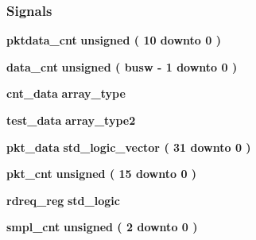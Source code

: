 \subsubsection*{Signals}
 \begin{DoxyCompactItemize}
\item 
{\bf pktdata\+\_\+cnt} {\bfseries \textcolor{comment}{unsigned}\textcolor{vhdlchar}{ }\textcolor{vhdlchar}{(}\textcolor{vhdlchar}{ }\textcolor{vhdlchar}{ } \textcolor{vhdldigit}{10} \textcolor{vhdlchar}{ }\textcolor{keywordflow}{downto}\textcolor{vhdlchar}{ }\textcolor{vhdlchar}{ } \textcolor{vhdldigit}{0} \textcolor{vhdlchar}{ }\textcolor{vhdlchar}{)}\textcolor{vhdlchar}{ }} 
\item 
{\bf data\+\_\+cnt} {\bfseries \textcolor{comment}{unsigned}\textcolor{vhdlchar}{ }\textcolor{vhdlchar}{(}\textcolor{vhdlchar}{ }\textcolor{vhdlchar}{ }\textcolor{vhdlchar}{ }\textcolor{vhdlchar}{ }{\bfseries {\bf busw}} \textcolor{vhdlchar}{-\/}\textcolor{vhdlchar}{ } \textcolor{vhdldigit}{1} \textcolor{vhdlchar}{ }\textcolor{keywordflow}{downto}\textcolor{vhdlchar}{ }\textcolor{vhdlchar}{ } \textcolor{vhdldigit}{0} \textcolor{vhdlchar}{ }\textcolor{vhdlchar}{)}\textcolor{vhdlchar}{ }} 
\item 
{\bf cnt\+\_\+data} {\bfseries {\bfseries {\bf array\+\_\+type}} \textcolor{vhdlchar}{ }} 
\item 
{\bf test\+\_\+data} {\bfseries {\bfseries {\bf array\+\_\+type2}} \textcolor{vhdlchar}{ }} 
\item 
{\bf pkt\+\_\+data} {\bfseries \textcolor{comment}{std\+\_\+logic\+\_\+vector}\textcolor{vhdlchar}{ }\textcolor{vhdlchar}{(}\textcolor{vhdlchar}{ }\textcolor{vhdlchar}{ } \textcolor{vhdldigit}{31} \textcolor{vhdlchar}{ }\textcolor{keywordflow}{downto}\textcolor{vhdlchar}{ }\textcolor{vhdlchar}{ } \textcolor{vhdldigit}{0} \textcolor{vhdlchar}{ }\textcolor{vhdlchar}{)}\textcolor{vhdlchar}{ }} 
\item 
{\bf pkt\+\_\+cnt} {\bfseries \textcolor{comment}{unsigned}\textcolor{vhdlchar}{ }\textcolor{vhdlchar}{(}\textcolor{vhdlchar}{ }\textcolor{vhdlchar}{ } \textcolor{vhdldigit}{15} \textcolor{vhdlchar}{ }\textcolor{keywordflow}{downto}\textcolor{vhdlchar}{ }\textcolor{vhdlchar}{ } \textcolor{vhdldigit}{0} \textcolor{vhdlchar}{ }\textcolor{vhdlchar}{)}\textcolor{vhdlchar}{ }} 
\item 
{\bf rdreq\+\_\+reg} {\bfseries \textcolor{comment}{std\+\_\+logic}\textcolor{vhdlchar}{ }} 
\item 
{\bf smpl\+\_\+cnt} {\bfseries \textcolor{comment}{unsigned}\textcolor{vhdlchar}{ }\textcolor{vhdlchar}{(}\textcolor{vhdlchar}{ }\textcolor{vhdlchar}{ } \textcolor{vhdldigit}{2} \textcolor{vhdlchar}{ }\textcolor{keywordflow}{downto}\textcolor{vhdlchar}{ }\textcolor{vhdlchar}{ } \textcolor{vhdldigit}{0} \textcolor{vhdlchar}{ }\textcolor{vhdlchar}{)}\textcolor{vhdlchar}{ }} 
\end{DoxyCompactItemize}


